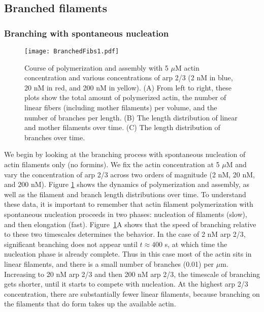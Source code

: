\documentclass[11pt]{article}
\begin{document}
\subsection{Branched filaments \label{sec:BF}}

\subsubsection{Branching with spontaneous nucleation \label{sec:BrSN}}

\begin{figure}
\centering
\texttt{[image: BranchedFibs1.pdf]}
\caption{\label{fig:PolyDynamicsArp}Course of polymerization and assembly with 5 $\mu$M actin concentration and various concentrations of arp 2/3 (2 nM in blue, 20 nM in red, and 200 nM in yellow). (A) From left to right, these plots show the total amount of polymerized actin, the number of linear fibers (including mother filaments) per volume, and the number of branches per length. (B) The length distribution of linear and mother filaments over time. (C) The length distribution of branches over time.}
\end{figure}

We begin by looking at the branching process with spontaneous nucleation of actin filaments only (no formins). We fix the actin concentration at 5 $\mu$M and vary the concentration of arp 2/3 across two orders of magnitude (2 nM, 20 nM, and 200 nM). Figure \ref{fig:PolyDynamicsArp} shows the dynamics of polymerization and assembly, as well as the filament and branch length distributions over time. To understand these data, it is important to remember that actin filament polymerization with spontaneous nucleation proceeds in two phases: nucleation of filaments (slow), and then elongation (fast). Figure\ \ref{fig:PolyDynamicsArp}A shows that the speed of branching relative to these two timescales determines the behavior. In the case of 2 nM arp 2/3, significant branching does not appear until $t \approx 400$ s, at which time the nucleation phase is already complete. Thus in this case most of the actin sits in linear filaments, and there is a small number of branches (0.01) per $\mu$m. Increasing to 20 nM arp 2/3 and then 200 nM arp 2/3, the timescale of branching gets shorter, until it starts to compete with nucleation. At the highest arp 2/3 concentration, there are substantially fewer linear filaments, because branching on the filaments that do form takes up the available actin.
\end{document}
